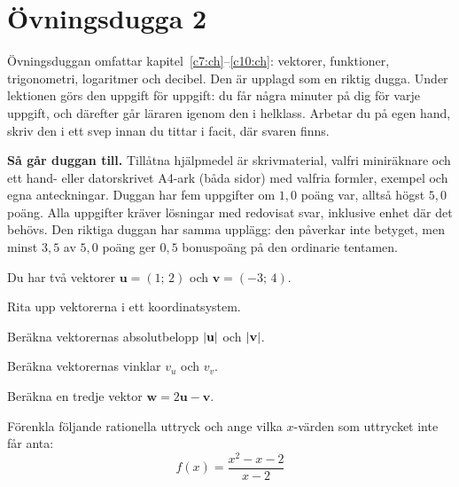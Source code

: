 
\section{Övningsdugga 2}
\label{c11:sec:ovningsdugga}
Övningsduggan omfattar kapitel~\ref{c7:ch}--\ref{c10:ch}: vektorer, funktioner, trigonometri,
logaritmer och decibel. Den är upplagd som en riktig dugga. Under lektionen görs den uppgift för
uppgift: du får några minuter på dig för varje uppgift, och därefter går läraren igenom den i
helklass. Arbetar du på egen hand, skriv den i ett svep innan du tittar i facit, där svaren finns.

\begin{aside}
\textbf{Så går duggan till.} Tillåtna hjälpmedel är skrivmaterial, valfri miniräknare och ett
hand- eller datorskrivet A4-ark (båda sidor) med valfria formler, exempel och egna anteckningar.
Duggan har fem uppgifter om $1{,}0$ poäng var, alltså
högst $5{,}0$ poäng. Alla uppgifter kräver lösningar med redovisat svar, inklusive enhet där det
behövs. Den riktiga duggan har samma upplägg: den påverkar inte betyget, men minst $3{,}5$ av
$5{,}0$ poäng ger $0{,}5$ bonuspoäng på den ordinarie tentamen.
\end{aside}


Du har två vektorer $\mathbf{u} = (1;\,2)$ och $\mathbf{v} = (-3;\,4)$.
\begin{parts}
  \item Rita upp vektorerna i ett koordinatsystem.
  \item Beräkna vektorernas absolutbelopp $\lvert\mathbf{u}\rvert$ och $\lvert\mathbf{v}\rvert$.
  \item Beräkna vektorernas vinklar $v_u$ och $v_v$.
  \item Beräkna en tredje vektor $\mathbf{w} = 2\mathbf{u} - \mathbf{v}$.
\end{parts}

Förenkla följande rationella uttryck och ange vilka $x$-värden som uttrycket inte får anta:
\[
  f(x) = \frac{x^2 - x - 2}{x - 2}
\]

